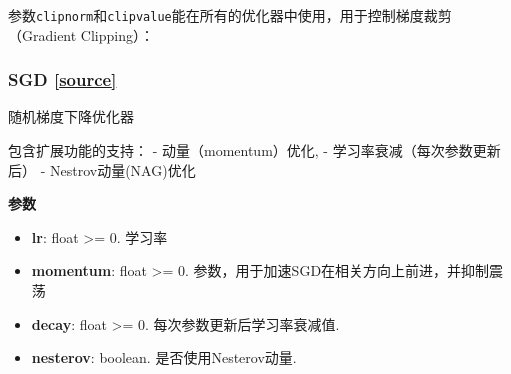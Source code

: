 参数\texttt{clipnorm}和\texttt{clipvalue}能在所有的优化器中使用，用于控制梯度裁剪（Gradient
Clipping）：

\begin{Shaded}
\begin{Highlighting}[]
  

\OperatorTok{=} \OperatorTok{=}\OperatorTok{=}
\end{Highlighting}
\end{Shaded}

\begin{Shaded}
\begin{Highlighting}[]
  

\OperatorTok{=} \OperatorTok{=}\OperatorTok{=}\NormalTok{)}
\end{Highlighting}
\end{Shaded}


 
\subsubsection{SGD {\href{https://github.com/keras-team/keras/blob/master/keras/optimizers.py\#L135}{{[}source{]}}}}

\begin{Shaded}
\begin{Highlighting}[]
\OperatorTok{=}\OperatorTok{=}\OperatorTok{=}\OperatorTok{=}\NormalTok{)}
\end{Highlighting}
\end{Shaded}

随机梯度下降优化器

包含扩展功能的支持： - 动量（momentum）优化, -
学习率衰减（每次参数更新后） - Nestrov动量(NAG)优化

\textbf{参数}

\begin{itemize}
\tightlist
\item
  \textbf{lr}: float \textgreater{}= 0. 学习率
\item
  \textbf{momentum}: float \textgreater{}= 0.
  参数，用于加速SGD在相关方向上前进，并抑制震荡
\item
  \textbf{decay}: float \textgreater{}= 0. 每次参数更新后学习率衰减值.
\item
  \textbf{nesterov}: boolean. 是否使用Nesterov动量.
\end{itemize}



